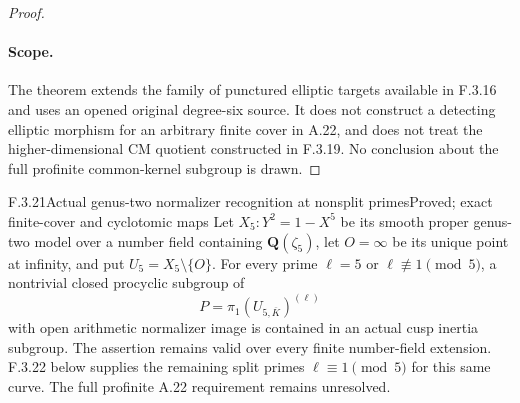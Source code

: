 \begin{proof}
\paragraph{Scope.}
The theorem extends the family of punctured elliptic targets available
in F.3.16 and uses an opened original degree-six source. It does not
construct a detecting elliptic morphism for an arbitrary finite
cover in A.22, and does not treat the higher-dimensional CM quotient
constructed in F.3.19. No conclusion about the full profinite
common-kernel subgroup is drawn.
\end{proof}

\begin{result}{F.3.21}{Actual genus-two normalizer recognition at nonsplit primes}{Proved; exact finite-cover and cyclotomic maps}
Let $X_5:Y^2=1-X^5$ be its smooth proper genus-two model over a
number field containing $\mathbf Q(\zeta_5)$, let $O=\infty$ be its
unique point at infinity, and put $U_5=X_5\setminus\{O\}$.
For every prime $\ell=5$ or $\ell\not\equiv1\pmod5$, a nontrivial
closed procyclic subgroup of
\[
 P=\pi_1(U_{5,\overline K})^{(\ell)}
\]
with open arithmetic normalizer image is contained in an actual
cusp inertia subgroup. The assertion remains valid over every
finite number-field extension. F.3.22 below supplies the remaining split primes
$\ell\equiv1\pmod5$ for this same curve. The full profinite
A.22 requirement remains unresolved.
\end{result}
